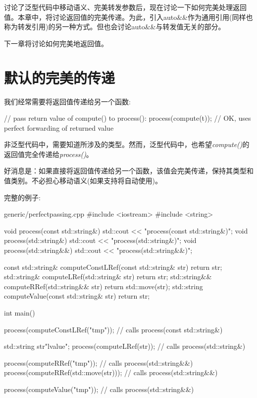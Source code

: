
讨论了泛型代码中移动语义、完美转发参数后，现在讨论一下如何完美处理返回值。本章中，将讨论返回值的完美传递。为此，引入auto\&\&作为通用引用(同样也称为转发引用)的另一种方式。但也会讨论auto\&\&与转发值无关的部分。\par

下一章将讨论如何完美地返回值。\par


\section{默认的完美的传递}

我们经常需要将返回值传递给另一个函数:\par

\begin{codebox}[cpp]
// pass return value of compute() to process():
process(compute(t)); // OK, uses perfect forwarding of returned value
\end{codebox}

非泛型代码中，需要知道所涉及的类型。然而，泛型代码中，也希望\textit{compute()}的返回值完全传递给\textit{process()}。\par

好消息是：如果直接将返回值传递给另一个函数，该值会完美传递，保持其类型和值类别。不必担心移动语义(如果支持将自动使用)。\par


完整的例子:\par

\begin{codeboxt}[cpp]{generic/perfectpassing.cpp}
#include <iostream>
#include <string>

void process(const std::string&) {
  std::cout << "process(const std::string&)\n";
}
void process(std::string&) {
  std::cout << "process(std::string&)\n";
}
void process(std::string&&) {
  std::cout << "process(std::string&&)\n";
}

const std::string& computeConstLRef(const std::string& str) {
  return str;
}
  std::string& computeLRef(std::string& str) {
  return str;
}
  std::string&& computeRRef(std::string&& str) {
  return std::move(str);
}
  std::string computeValue(const std::string& str) {
  return str;
}

int main()
{
  process(computeConstLRef("tmp")); // calls process(const std::string&)

  std::string str{"lvalue"};
  process(computeLRef(str)); // calls process(std::string&)

  process(computeRRef("tmp")); // calls process(std::string&&)
  process(computeRRef(std::move(str))); // calls process(std::string&&)

  process(computeValue("tmp")); // calls process(std::string&&)
}
\end{codeboxt}

